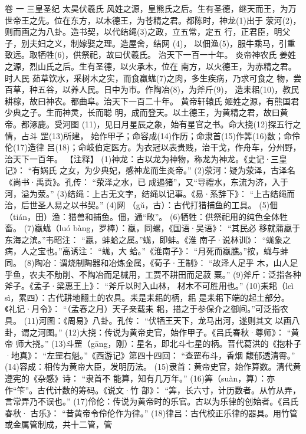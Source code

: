 \documentclass[12pt,UTF8]{ctexbook}
\begin{document}
卷 一
三皇圣纪
太昊伏羲氏 风姓之源，皇熊氏之后。生有圣德，继天而王，为万
世帝王之先。位在东方，以木德王，为苍精之君。都陈时，神龙(1)出于
荥河(2)，则而画之为八卦。造书契，以代结绳(3)之政，立五常，定五
行，正君臣，明父子，别夫妇之义，制嫁娶之理。造屋舍，结网 (4)，
以佃渔(5)，服牛乘马，引重致远。取牺牲(6)，供祭祀，故曰伏羲氏。
治天下一百一十年。
炎帝神农氏 姜姓之源，烈山氏之后。生有圣德，以火承木，位在
南方，以火德王，为赤精之君。时人民
茹草饮水，采树木之实，而食蠃蛖(7)之肉，多生疾病，乃求可食之
物，尝百草，种五谷，以养人民。日中为市。作陶冶(8)，为斧斤(9)，
造耒耜(10)，教民耕稼，故曰神农。都曲阜。治天下一百二十年。
黄帝轩辕氏 姬姓之源，有熊国君少典之子。生而神灵，长而聪
明，成而登天。以土德王，为黄精之君，故曰黄帝。都涿鹿。受河图
(11)，见日月星辰之象，始有星官之书。命大挠(12)探五行之情，占斗
罡(13)所建，
始作甲子；命容成(14)作历；命隶首(15)作筭(16)数；命伶伦(17)造律
吕(18)；命岐伯定医方。为衣冠以表贵贱，治干戈，作舟车，分州野，
治天下一百年。
【注释】
(1)神龙：古以龙为神物，称龙为神龙。《史记·三皇记》：
“有娲氏
之女，为少典妃，感神龙而生炎帝。”
(2)荥河：疑为荥泽，古泽名《尚书·禹贡》。孔传：
“荥泽之水，已
成遏猪”，又“导禮水，东流为济，入于河，溢为荥。”
(3)结绳：上古无文字，结绳以记事。《易·系辞下》：
“上古结绳而
治，后世圣人易之以书契。”
(4)网 （gǔ，古）：古代打猎捕鱼的工具。
(5)佃（tián，田）渔：猎兽和捕鱼。佃，通“畋”。
(6)牺牲：供祭祀用的纯色全体牲畜。
(7)蠃蛖（luó bàng，罗棒）：蠃，同螺，《国语·吴语》：
“其民必
移就蒲蠃于东海之滨。”韦昭注：
“蠃，蚌蛤之属。”蛖，即蚌。《淮
南子·说林训》：
“蛖象之病，人之宝也。”高诱注：
“蛖，大
蛤。”《淮南子》：
“月死而蠃膲。”按，蛖与蚌同。
(8)陶冶：谓烧制陶器和冶炼金属，《荀子·王制》：
“故泽人足乎
木，山人足乎鱼，农夫不觔削、不陶冶而足械用，工贾不耕田而足菽
粟。”
(9)斧斤：泛指各种斧子。《孟子·梁惠王上》：
“斧斤以时入山林，
材木不可胜用也。”
(10)耒耜（leì sì，累四）：古代耕地翻土的农具。耒是耒耜的柄，耜
是耒耜下端的起土部分。《礼记·月令》：
“（孟春之月）天子亲载耒
耜，措之于参保介之御间。”可泛指农具。
(11)河图：《周易》八卦。孔传：
“伏牺王天下，龙马出河，遂则其文
以画八卦，谓之河图。”
(12)大挠：传说为黄帝史官，始作甲子。《吕氏春秋·尊师》：
“黄帝
师大挠。”
(13)斗罡（gāng，刚）：星名，即北斗七星的柄。晋代葛洪的《抱朴子
·地真》：
“左罡右魁。”《西游记》第四十四回：
“查罡布斗，香烟
馥郁透清霄。”
(14)容成：相传为黄帝大臣，发明历法。
(15)隶首：黄帝史官，始作算数。清代黄遵宪的《杂感》诗：
“隶首不
能算，知有几万年。”
(16)筭（suàn，算）：亦作“笇”。古代计数的筹码。《说文·竹
部》：
“筭，长六寸，计历数者。从竹从弄，言常弄乃不误也。”
(17)伶伦：传说为黄帝时的乐官。古以为乐律的创始者。《吕氏春秋·
古乐》：
“昔黄帝令伶伦作为律。”
(18)律吕：古代校正乐律的器具。用竹管或金属管制成，共十二管，管
\end{document}

